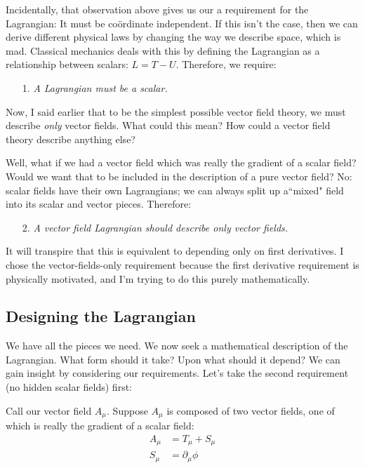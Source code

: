 \documentclass[11pt]{article}
\begin{document}
Incidentally, that observation above gives us our a requirement for the Lagrangian:  It must be co\"{o}rdinate independent.  If this isn't the case, then we can derive different physical laws by changing the way we describe space, which is mad.  Classical mechanics deals with this by defining the Lagrangian as a relationship between scalars:  $L = T-U$.  Therefore, we require:
\begin{itemize}
\item[1.] \emph{A Lagrangian must be a scalar.}
\end{itemize}

Now, I said earlier that to be the simplest possible vector field theory, we must describe \emph{only} vector fields.  What could this mean?  How could a vector field theory describe anything else?

Well, what if we had a vector field which was really the gradient of a scalar field?  Would we want that to be included in the description of a pure vector field?  No:  scalar fields have their own Lagrangians;  we can always split up a``mixed" field into its scalar and vector pieces.  Therefore:

\begin{itemize}
\item[2.] \emph{A vector field Lagrangian should describe \emph{only} vector fields.}
\end{itemize}

It will transpire that this is equivalent to depending only on first derivatives.  I chose the vector-fields-only requirement because the first derivative requirement is physically motivated, and I'm trying to do this purely mathematically.

\subsection{Designing the Lagrangian}
We have all the pieces we need.  We now seek a mathematical description of the Lagrangian.  What form should it take?  Upon what should it depend?  We can gain insight by considering our requirements.  Let's take the second requirement (no hidden scalar fields) first:

Call our vector field $A_\mu$.  Suppose $A_\mu$ is composed of two vector fields, one of which is really the gradient of a scalar field:
\begin{align*}
A_\mu &= T_\mu + S_\mu\\
S_\mu &= \partial_\mu \phi
\end{align*}
\end{document}
